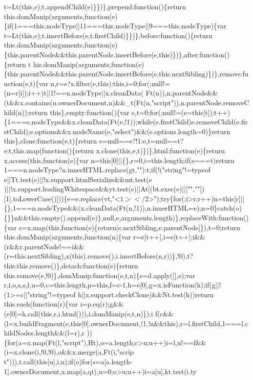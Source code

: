 \begin{DoxyCode}
{       t=Lt(this,e);t.appendChild(e)\}\})\},prepend:function()\{return
       this.domManip(arguments,function(e)\{if(1===this.nodeType||11===this.nodeType||9===this.nodeType)\{var t=Lt(this,e);t.insertBefore(e,t.firstChild)\}\})\},before:function()\{return
       this.domManip(arguments,function(e)\{this.parentNode&&this.parentNode.insertBefore(e,this)\})\},after:function()\{return
       t
      his.domManip(arguments,function(e)\{this.parentNode&&this.parentNode.insertBefore(e,this.nextSibling)\})\},remove:function(e,t)\{var
       n,r=e?x.filter(e,this):this,i=0;for(;null!=(n=r[i]);i++)t||1!==n.nodeType||x.cleanData(
      Ft(n)),n.parentNode&&(t&&x.contains(n.ownerDocument,n)&&\_t(Ft(n,"script")),n.parentNode.removeChild(n));return this\},empty:function()\{var
       e,t=0;for(;null!=(e=this[t]);t++)\{1===e.nodeType&&x.cleanData(Ft(e,!1));while(e.firstChild)e.removeChild(e.firstChild);e.options&&x.nodeName(e,"select")&&(e.options.length=0)\}return
       this\},clone:function(e,t)\{return e=null==e?!1:e,t=null==t?e:t,this.map(function()\{return
       x.clone(this,e,t)\})\},html:function(e)\{return x.access(this,function(e)\{var n=this[0]||\{\},r=0,i=this.length;if(e===t)return
       1===n.nodeType?n.innerHTML.replace(gt,""):t;if(!("string"!=typeof
       e||Tt.test(e)||!x.support.htmlSerialize&&mt.test(e
      )||!x.support.leadingWhitespace&&yt.test(e)||At[(bt.exec(e)||["",""])[1].toLowerCase()]))\{e=e.replace(vt,"<$
      1></$2>");try\{for(;i>r;r++)n=this[r]||\{\},1===n.nodeType&&(x.cleanData(Ft(n,!1)),n.innerHTML=e);n=0\}catch(o)\{\}\}n&&this.empty().append(e)\},null,e,arguments.length)\},replaceWith:function()\{var
       e=x.map(this,function(e)\{return[e.nextSibling,e.parentNode]\}),t=0;return this.domManip(arguments,function(n)\{var
       r=e[t++],i=e[t++];i&&
      (r&&r.parentNode!==i&&(r=this.nextSibling),x(this).remove(),i.insertBefore(n,r))\},!0),t?this:this.remove()\},detach:function(e)\{return this.remove(e,!0)\},domManip:function(e,t,n)\{e=d.apply([],e);var
       r,i,o,a,s,l,u=0,c=this.length,p=this,f=c-1,h=e[0],g=x.isFunction(h);if(g||!(1>=c||"string"!=typeof
       h||x.support.checkClone)&&Nt.test(h))return this.each(function(r)\{var
       i=p.eq(r);g&&(e[0]=h.call(this,r,i.html())),i.domManip(e,t,n)\});i
      f(c&&(l=x.buildFragment(e,this[0].ownerDocument,!1,!n&&this),r=l.firstChild,1===l.childNodes.length&&(l=r),r
      ))\{for(a=x.map(Ft(l,"script"),Ht),o=a.length;c>u;u++)i=l,u!==f&&(i=x.clone(i,!0,!0),o&&x.merge(a,Ft(i,"scrip
      t"))),t.call(this[u],i,u);if(o)for(s=a[a.length-1].ownerDocument,x.map(a,qt),u=0;o>u;u++)i=a[u],kt.test(i.ty
}
\end{DoxyCode}
